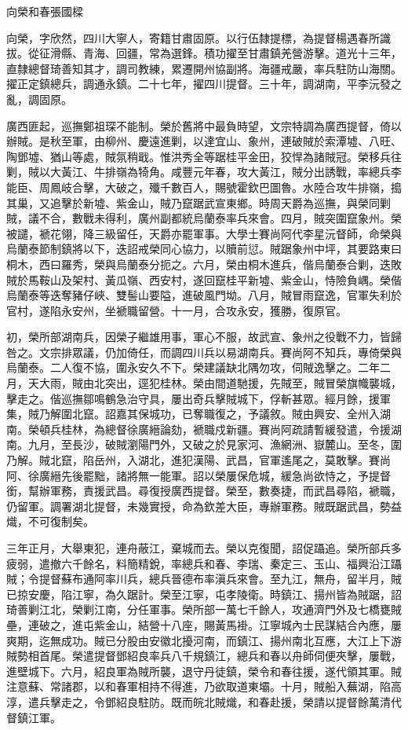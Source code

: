 
\begin{pinyinscope}
向榮和春張國樑

向榮，字欣然，四川大寧人，寄籍甘肅固原。以行伍隸提標，為提督楊遇春所識拔。從征滑縣、青海、回疆，常為選鋒。積功擢至甘肅鎮羌營游擊。道光十三年，直隸總督琦善知其才，調司教練，累遷開州協副將。海疆戒嚴，率兵駐防山海關。擢正定鎮總兵，調通永鎮。二十七年，擢四川提督。三十年，調湖南，平李沅發之亂，調固原。

廣西匪起，巡撫鄭祖琛不能制。榮於舊將中最負時望，文宗特調為廣西提督，倚以辦賊。是秋至軍，由柳州、慶遠進剿，以達宜山、象州，連破賊於索潭墟、八旺、陶鄧墟、猶山等處，賊氛稍戢。惟洪秀全等踞桂平金田，狡悍為諸賊冠。榮移兵往剿，賊以大黃江、牛排嶺為犄角。咸豐元年春，攻大黃江，賊分出誘戰，率總兵李能臣、周鳳岐合擊，大破之，殲千數百人，賜號霍欽巴圖魯。水陸合攻牛排嶺，搗其巢，又追擊於新墟、紫金山，賊乃竄踞武宣東鄉。時周天爵為巡撫，與榮同剿賊，議不合，數戰未得利，廣州副都統烏蘭泰率兵來會。四月，賊突圍竄象州。榮被譴，褫花翎，降三級留任，天爵亦罷軍事。大學士賽尚阿代李星沅督師，命榮與烏蘭泰節制鎮將以下，迭詔戒榮同心協力，以贖前愆。賊踞象州中坪，其要路東曰桐木，西曰羅秀，榮與烏蘭泰分扼之。六月，榮由桐木進兵，偕烏蘭泰合剿，迭敗賊於馬鞍山及架村、黃瓜嶺、西安村，遂回竄桂平新墟、紫金山，恃險負嵎。榮偕烏蘭泰等迭奪豬仔峽、雙髻山要隘，進破風門坳。八月，賊冒雨竄逸，官軍失利於官村，遂陷永安州，坐褫職留營。十一月，合攻永安，獲勝，復原官。

初，榮所部湖南兵，因榮子繼雄用事，軍心不服，故武宣、象州之役戰不力，皆歸咎之。文宗排眾議，仍加倚任，而調四川兵以易湖南兵。賽尚阿不知兵，專倚榮與烏蘭泰。二人復不協，圍永安久不下。榮建議缺北隅勿攻，伺賊逸擊之。二年二月，天大雨，賊由北突出，逕犯桂林。榮由間道馳援，先賊至，賊冒榮旗幟襲城，擊走之。偕巡撫鄒鳴鶴急治守具，屢出奇兵擊賊城下，俘斬甚眾。經月餘，援軍集，賊乃解圍北竄。詔嘉其保城功，已奪職復之，予議敘。賊由興安、全州入湖南。榮頓兵桂林，為總督徐廣縉論劾，褫職戍新疆。賽尚阿疏請暫緩發遣，令援湖南。九月，至長沙，破賊瀏陽門外，又破之於見家河、漁網洲、嶽麓山。至冬，圍乃解。賊北竄，陷岳州，入湖北，進犯漢陽、武昌，官軍遙尾之，莫敢擊。賽尚阿、徐廣縉先後罷黜，諸將無一能軍。詔以榮屢保危城，緩急尚欲恃之，予提督銜，幫辦軍務，責援武昌。尋復授廣西提督。榮至，數奏捷，而武昌尋陷，褫職，仍留軍。調署湖北提督，未幾實授，命為欽差大臣，專辦軍務。賊既踞武昌，勢益熾，不可復制矣。

三年正月，大舉東犯，連舟蔽江，棄城而去。榮以克復聞，詔促躡追。榮所部兵多疲弱，遣撤六千餘名，料簡精銳，率總兵和春、李瑞、秦定三、玉山、福興沿江躡賊；令提督蘇布通阿率川兵，總兵晉德布率滇兵來會。至九江，無舟，留半月，賊已掠安慶，陷江寧，為久踞計。榮至江寧，屯孝陵衛。時鎮江、揚州皆為賊踞，詔琦善剿江北，榮剿江南，分任軍事。榮所部一萬七千餘人，攻通濟門外及七橋甕賊壘，連破之，進屯紫金山，結營十八座，賜黃馬褂。江寧城內士民謀結合內應，屢爽期，迄無成功。賊已分股由安徽北擾河南，而鎮江、揚州南北互應，大江上下游賊勢相首尾。榮遣提督鄧紹良率兵八千規鎮江，總兵和春以舟師伺便夾擊，屢戰，進壁城下。六月，紹良軍為賊所襲，退守丹徒鎮，榮令和春往援，遂代領其軍。賊注意蘇、常諸郡，以和春軍相持不得進，乃欲取道東壩。十月，賊船入蕪湖，陷高淳，遣兵擊走之，令鄧紹良駐防。既而皖北賊熾，和春赴援，榮請以提督餘萬清代督鎮江軍。


\end{pinyinscope}
